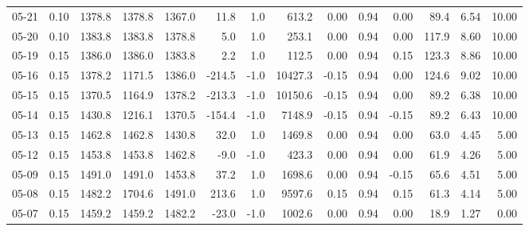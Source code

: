 \begin{threeparttable}
{\begin{tabular}{lrrrrrrrrrrrrr}
  05-21 &     0.10 & 1378.8 & 1378.8 & 1367.0 &       11.8 &                      1.0 &               613.2 &       0.00 &      0.94 &           0.00 &             89.4 &            6.54 &                  10.00 \\
  05-20 &     0.10 & 1383.8 & 1383.8 & 1378.8 &        5.0 &                      1.0 &               253.1 &       0.00 &      0.94 &           0.00 &            117.9 &            8.60 &                  10.00 \\
  05-19 &     0.15 & 1386.0 & 1386.0 & 1383.8 &        2.2 &                      1.0 &               112.5 &       0.00 &      0.94 &           0.15 &            123.3 &            8.86 &                  10.00 \\
  05-16 &     0.15 & 1378.2 & 1171.5 & 1386.0 &     -214.5 &                     -1.0 &             10427.3 &      -0.15 &      0.94 &           0.00 &            124.6 &            9.02 &                  10.00 \\
  05-15 &     0.15 & 1370.5 & 1164.9 & 1378.2 &     -213.3 &                     -1.0 &             10150.6 &      -0.15 &      0.94 &           0.00 &             89.2 &            6.38 &                  10.00 \\
  05-14 &     0.15 & 1430.8 & 1216.1 & 1370.5 &     -154.4 &                     -1.0 &              7148.9 &      -0.15 &      0.94 &          -0.15 &             89.2 &            6.43 &                  10.00 \\
  05-13 &     0.15 & 1462.8 & 1462.8 & 1430.8 &       32.0 &                      1.0 &              1469.8 &       0.00 &      0.94 &           0.00 &             63.0 &            4.45 &                   5.00 \\
  05-12 &     0.15 & 1453.8 & 1453.8 & 1462.8 &       -9.0 &                     -1.0 &               423.3 &       0.00 &      0.94 &           0.00 &             61.9 &            4.26 &                   5.00 \\
  05-09 &     0.15 & 1491.0 & 1491.0 & 1453.8 &       37.2 &                      1.0 &              1698.6 &       0.00 &      0.94 &          -0.15 &             65.6 &            4.51 &                   5.00 \\
  05-08 &     0.15 & 1482.2 & 1704.6 & 1491.0 &      213.6 &                      1.0 &              9597.6 &       0.15 &      0.94 &           0.15 &             61.3 &            4.14 &                   5.00 \\
  05-07 &     0.15 & 1459.2 & 1459.2 & 1482.2 &      -23.0 &                     -1.0 &              1002.6 &       0.00 &      0.94 &           0.00 &             18.9 &            1.27 &                   0.00 \\

\end{tabular}}
\end{threeparttable}
